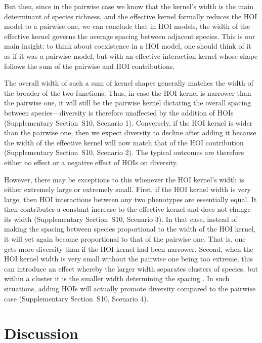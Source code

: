 \documentclass[11pt]{article}
\newcommand{\SI}{Supplementary}
\begin{document}
But then, since in the pairwise case we know that the kernel's width is the main determinant of species richness, and the effective kernel formally reduces the HOI model to a pairwise one, we can conclude that in HOI models, the width of the effective kernel governs the average spacing between adjacent species. This is our main insight: to think about coexistence in a HOI model, one should think of it as if it was a pairwise model, but with an effective interaction kernel whose shape follows the sum of the pairwise and HOI contributions.

The overall width of such a sum of kernel shapes generally matches the width of the broader of the two functions. Thus, in case the HOI kernel is narrower than the pairwise one, it will still be the pairwise kernel dictating the overall spacing between species---diversity is therefore unaffected by the addition of HOIs (\SI{} Section~S10, Scenario 1). Conversely, if the HOI kernel is wider than the pairwise one, then we expect diversity to decline after adding it because the width of the effective kernel will now match that of the HOI contribution (\SI{} Section~S10, Scenario 2). The typical outcomes are therefore either no effect or a negative effect of HOIs on diversity.

However, there may be exceptions to this whenever the HOI kernel's width is either extremely large or extremely small. First, if the HOI kernel width is very large, then HOI interactions between any two phenotypes are essentially equal. It then contributes a constant increase to the effective kernel and does not change its width (\SI{} Section~S10, Scenario 3). In that case, instead of making the spacing between species proportional to the width of the HOI kernel, it will yet again become proportional to that of the pairwise one. That is, one gets more diversity than if the HOI kernel had been narrower. Second, when the HOI kernel width is very small without the pairwise one being too extreme, this can introduce an effect whereby the larger width separates clusters of species, but within a cluster it is the smaller width determining the spacing \citep{barabas_emergent_2013}. In such situations, adding HOIs will actually promote diversity compared to the pairwise case (\SI{} Section~S10, Scenario 4).


\section{Discussion} \label{sec:discussion}
\end{document}
